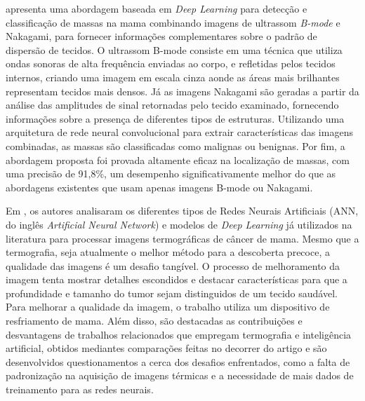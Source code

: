  apresenta uma abordagem baseada em \textit{Deep Learning} para detecção e classificação de massas na mama combinando imagens de ultrassom \textit{B-mode} e Nakagami, para fornecer informações complementares sobre o padrão de dispersão de tecidos. O ultrassom B-mode consiste em uma técnica que utiliza ondas sonoras de alta frequência enviadas ao corpo, e refletidas pelos tecidos internos, criando uma imagem em escala cinza aonde as áreas mais brilhantes representam tecidos mais densos. Já as imagens Nakagami são geradas a partir da análise das amplitudes de sinal retornadas pelo tecido examinado, fornecendo informações sobre a presença de diferentes tipos de estruturas. Utilizando uma arquitetura de rede neural convolucional para extrair características das imagens combinadas, as massas são classificadas como malignas ou benignas. Por fim, a abordagem proposta foi provada altamente eficaz na localização de massas, com uma precisão de 91,8\%, um desempenho significativamente melhor do que as abordagens existentes que usam apenas imagens B-mode ou Nakagami.

Em , os autores analisaram os diferentes tipos de Redes Neurais Artificiais (ANN, do inglês \textit{Artificial Neural Network}) e modelos de \textit{Deep Learning} já utilizados na literatura para processar imagens termográficas de câncer de mama. Mesmo que a termografia, seja atualmente o melhor método para a descoberta precoce, a qualidade das imagens é um desafio tangível. O processo de melhoramento da imagem tenta mostrar detalhes escondidos e destacar características para que a profundidade e tamanho do tumor sejam distinguidos de um tecido saudável. Para melhorar a qualidade da imagem, o trabalho utiliza um dispositivo de resfriamento de mama. Além disso, são destacadas as contribuições e desvantagens de trabalhos relacionados que empregam termografia e inteligência artificial, obtidos mediantes comparações feitas no decorrer do artigo e são desenvolvidos questionamentos a cerca dos desafios enfrentados, como a falta de padronização na aquisição de imagens térmicas e a necessidade de mais dados de treinamento para as redes neurais. 

